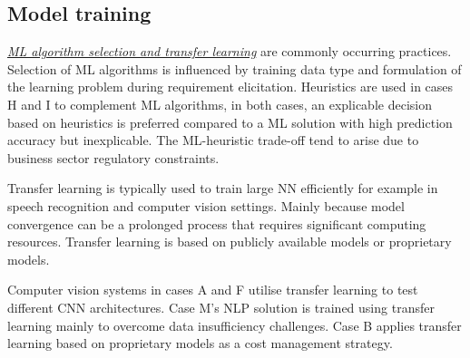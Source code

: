 \subsection{Model training}

\underline{\emph{ML algorithm selection and transfer learning}}
are commonly occurring practices. Selection of ML algorithms is influenced by training data type and formulation of the learning problem during requirement elicitation. Heuristics are used in cases H and I to complement ML algorithms, in both cases, an explicable decision based on heuristics is preferred compared to a ML solution with high prediction accuracy but inexplicable. The ML-heuristic trade-off tend to arise due to business sector regulatory constraints.


Transfer learning is typically used to train large NN efficiently for example in speech recognition and computer vision settings. Mainly because model convergence can be a prolonged process that requires significant computing resources. Transfer learning is based on publicly available models or proprietary models.

Computer vision systems in cases A and F utilise transfer learning to test different CNN architectures. Case M's NLP solution is trained using transfer learning mainly to overcome data insufficiency challenges. Case B applies transfer learning based on proprietary models as a cost management strategy. 

